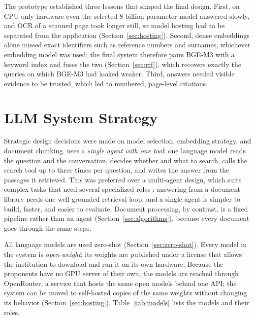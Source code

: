The prototype established three lessons that shaped the final design. First, on CPU-only hardware even the selected 8-billion-parameter model answered slowly, and OCR of a scanned page took longer still, so model hosting had to be separated from the application (Section~\ref{sec:hosting}). Second, dense embeddings alone missed exact identifiers such as reference numbers and surnames, whichever embedding model was used; the final system therefore pairs BGE-M3 with a keyword index and fuses the two (Section~\ref{sec:rrf}), which recovers exactly the queries on which BGE-M3 had looked weaker. Third, answers needed visible evidence to be trusted, which led to numbered, page-level citations.

\section{LLM System Strategy}\label{sec:strategy}

Strategic design decisions were made on model selection, embedding strategy, and document chunking. \cs{} uses a \emph{single agent with one tool}: one language model reads the question and the conversation, decides whether and what to search, calls the search tool up to three times per question, and writes the answer from the passages it retrieved. This was preferred over a multi-agent design, which suits complex tasks that need several specialized roles \citep{chen2023}; answering from a document library needs one well-grounded retrieval loop, and a single agent is simpler to build, faster, and easier to evaluate. Document processing, by contrast, is a fixed pipeline rather than an agent (Section~\ref{sec:algorithms}), because every document goes through the same steps.

All language models are used zero-shot (Section~\ref{sec:zero-shot}). Every model in the system is \emph{open-weight}: its weights are published under a license that allows the institution to download and run it on its own hardware. Because the proponents have no GPU server of their own, the models are reached through OpenRouter, a service that hosts the same open models behind one API; the system can be moved to self-hosted copies of the same weights without changing its behavior (Section~\ref{sec:hosting}). Table~\ref{tab:models} lists the models and their roles.

